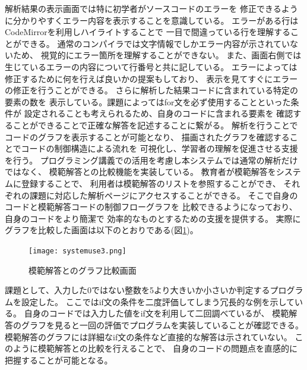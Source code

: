 \documentclass{cssspaper}
\begin{document}
        解析結果の表示画面では特に初学者がソースコードのエラーを
        修正できるように分かりやすくエラー内容を表示することを意識している。
        エラーがある行はCodeMirrorを利用しハイライトすることで
        一目で間違っている行を理解することができる。
        通常のコンパイラでは文字情報でしかエラー内容が示されていないため、
        視覚的にエラー箇所を理解することができない。
        また、画面右側では生じているエラーの内容について行番号と共に記している。
        エラーによっては修正するために何を行えば良いかの提案もしており、
        表示を見てすぐにエラーの修正を行うことができる。
        さらに解析した結果コードに含まれている特定の要素の数を
        表示している。課題によってはfor文を必ず使用することといった条件が
        設定されることも考えられるため、自身のコードに含まれる要素を
        確認することができることで正確な解答を記述することに繋がる。
        解析を行うことでコードのグラフを表示することが可能となり、
        描画されたグラフを確認することでコードの制御構造による流れを
        可視化し、学習者の理解を促進させる支援を行う。
        プログラミング講義での活用を考慮し本システムでは通常の解析だけではなく、
        模範解答との比較機能を実装している。
        教育者が模範解答をシステムに登録することで、
        利用者は模範解答のリストを参照することができ、
        それぞれの課題に対応した解析ページにアクセスすることができる。
        そこで自身のコードと模範解答コードの制御フローグラフを
        比較できるようになっており、自身のコードをより簡潔で
        効率的なものとするための支援を提供する。
        実際にグラフを比較した画面は以下のとおりである(図\ref{fig:systemuse3})。

        \begin{figure}[h]
            \centering
            \texttt{[image: systemuse3.png]}
            \caption{模範解答とのグラフ比較画面}
            \label{fig:systemuse3}
        \end{figure}

        課題として、入力した0ではない整数を5より大きいか小さいか判定するプログラムを設定した。
        ここではif文の条件を二度評価してしまう冗長的な例を示している。
        自身のコードでは入力した値をif文を利用して二回調べているが、
        模範解答のグラフを見ると一回の評価でプログラムを実装していることが確認できる。
        模範解答のグラフには詳細なif文の条件など直接的な解答は示されていない。
        このように模範解答との比較を行えることで、
        自身のコードの問題点を直感的に把握することが可能となる。
\end{document}
